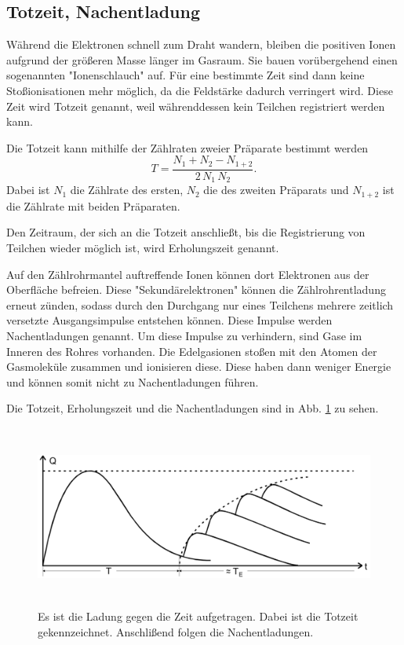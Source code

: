 \subsection{Totzeit, Nachentladung}
Während die Elektronen schnell zum Draht wandern, bleiben die positiven Ionen aufgrund der größeren Masse länger im Gasraum. Sie bauen vorübergehend einen sogenannten "Ionenschlauch" auf. Für eine bestimmte Zeit sind dann keine Stoßionisationen mehr möglich, da die Feldstärke dadurch verringert wird. Diese Zeit wird Totzeit genannt, weil währenddessen kein Teilchen registriert werden kann.

\noindent Die Totzeit kann mithilfe der Zählraten zweier Präparate bestimmt werden
\begin{equation}
    T = \frac{N_1 + N_2 - N_{1+2}}{2 \, N_1 \, N_2}.
    \label{totzeit}
\end{equation}
Dabei ist $N_1$ die Zählrate des ersten, $N_2$ die des zweiten Präparats und $N_{1+2}$ ist die Zählrate mit beiden Präparaten.

\noindent Den Zeitraum, der sich an die Totzeit anschließt, bis die Registrierung von Teilchen wieder möglich ist, wird Erholungszeit genannt.

\noindent Auf den Zählrohrmantel auftreffende Ionen können dort Elektronen aus der Oberfläche befreien. Diese "Sekundärelektronen" können die Zählrohrentladung erneut zünden, sodass durch den Durchgang nur eines Teilchens mehrere zeitlich versetzte Ausgangsimpulse entstehen können. 
Diese Impulse werden Nachentladungen genannt. 
Um diese Impulse zu verhindern, sind Gase im Inneren des Rohres vorhanden. Die Edelgasionen stoßen mit den Atomen der Gasmoleküle zusammen und ionisieren diese. Diese haben dann weniger Energie und können somit nicht zu Nachentladungen führen. 

\noindent Die Totzeit, Erholungszeit und die Nachentladungen sind in Abb. \ref{fig:totzeit} zu sehen.

\begin{figure}
    \centering
    \includegraphics[width=12cm, height=6cm]{build/totzeit.png}
    \caption{Es ist die Ladung gegen die Zeit aufgetragen. Dabei ist die Totzeit gekennzeichnet. Anschlißend folgen die Nachentladungen. \cite{V703}}
    \label{fig:totzeit}
\end{figure}


